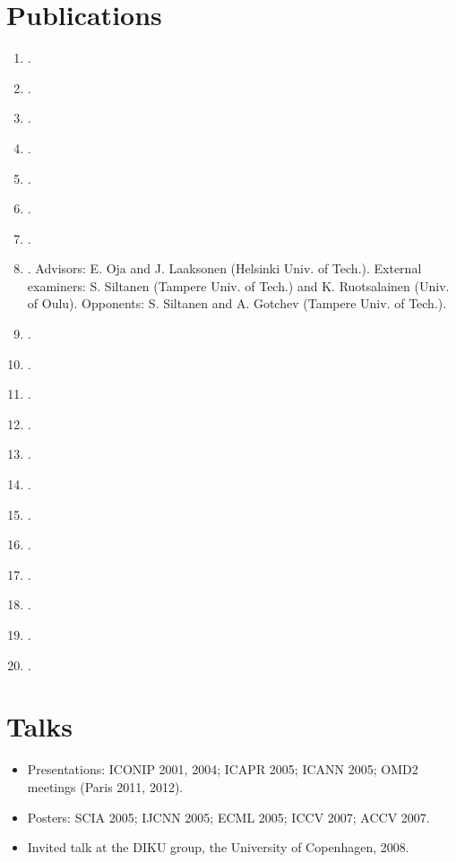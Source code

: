 \documentclass[a4paper,11pt]{article}
\begin{document}
\section{Publications}
\label{sect:pubs}
%
\begin{enumerate}
\item {}.
\item {}.
\item {}.
\item {}.
\item {}.
\item {}.
\item {}.
\item {}.
Advisors: E. Oja and J. Laaksonen (Helsinki Univ. of Tech.). External examiners: S. Siltanen (Tampere Univ. of Tech.) 
and K. Ruotsalainen (Univ. of Oulu). Opponents: S. Siltanen and A. Gotchev (Tampere Univ. of Tech.).
\item {}.
\item {}.
\item {}.
\item {}.
\item {}.
\item {}.
\item {}.
\item {}.
\item {}.
\item {}.
\item {}.
\item {}.
\end{enumerate}

%
\section{Talks}
%
\begin{itemize}
    \item Presentations: ICONIP 2001, 2004; ICAPR 2005; ICANN 2005; OMD2 meetings (Paris 2011, 2012).
    \item Posters: SCIA 2005; IJCNN 2005; ECML 2005; ICCV 2007; ACCV 2007.
    \item Invited talk at the DIKU group, the University of Copenhagen, 2008.
\end{itemize}
%
\end{document}
